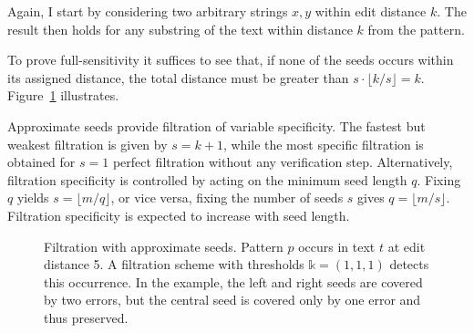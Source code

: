 Again, I start by considering two arbitrary strings $x,y$ within edit distance $k$.
The result then holds for any substring of the text within distance $k$ from the pattern.
To prove full-sensitivity it suffices to see that, if none of the seeds occurs within its assigned distance, the total distance must be greater than $s \cdot \lfloor k/s \rfloor = k$.
Figure~\ref{fig:seeds-apx} illustrates.

Approximate seeds provide filtration of variable specificity.
The fastest but weakest filtration is given by $s=k+1$, while the most specific filtration is obtained for $s=1$ \ie perfect filtration without any verification step.
Alternatively, filtration specificity is controlled by acting on the minimum seed length $q$.
Fixing $q$ yields $s = \lfloor m/q \rfloor$, or vice versa, fixing the number of seeds $s$ gives $q =\lfloor m/s \rfloor$.
Filtration specificity is expected to increase with seed length.

\begin{figure}[h]
\begin{center}
\caption[Filtration with approximate seeds]{Filtration with approximate seeds. Pattern $p$ occurs in text $t$ at edit distance 5. A filtration scheme with thresholds $\mathbb{k} = (1,1,1)$ detects this occurrence. In the example, the left and right seeds are covered by two errors, but the central seed is covered only by one error and thus preserved.}
\label{fig:seeds-apx}

\end{center}
\end{figure}


